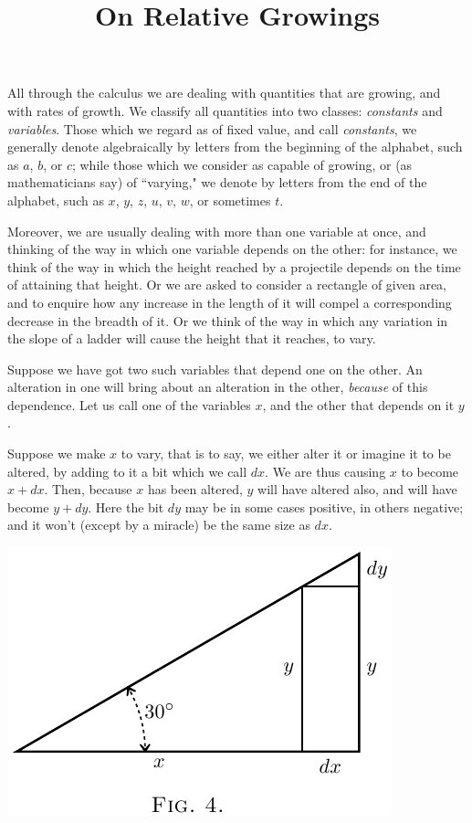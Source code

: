 \documentclass{ximera}
\title{On Relative Growings}
\begin{document}
\begin{abstract}
\end{abstract}
\maketitle

All through the calculus we are dealing with quantities
that are growing, and with rates of growth.
We classify all quantities into two classes: \textit{constants}
and \textit{variables}. Those which we regard as of fixed
value, and call \textit{constants}, we generally denote algebraically
by letters from the beginning of the
alphabet, such as $a$, $b$, or $c$; while those which we
consider as capable of growing, or (as mathematicians
say) of ``varying," we denote by letters from the end
of the alphabet, such as $x$, $y$, $z$, $u$, $v$, $w$, or sometimes $t$.

Moreover, we are usually dealing with more than
one variable at once, and thinking of the way in
which one variable depends on the other: for instance,
we think of the way in which the height reached
by a projectile depends on the time of attaining that
height. Or we are asked to consider a rectangle of
given area, and to enquire how any increase in the
length of it will compel a corresponding decrease in
the breadth of it. Or we think of the way in which
any variation in the slope of a ladder will cause the
height that it reaches, to vary.

Suppose we have got two such variables that depend one on the other. An alteration in one will bring about an alteration in the other, \textit{because} of this
dependence. Let us call one of the variables $x$, and
the other that depends on it $y$.

Suppose we make $x$ to vary, that is to say, we
either alter it or imagine it to be altered, by adding
to it a bit which we call $dx$. We are thus causing $x$
to become $x + dx$. Then, because $x$ has been altered,
$y$ will have altered also, and will have become $y + dy$.
Here the bit $dy$ may be in some cases positive, in
others negative; and it won't (except by a miracle) be
the same size as $dx$.

\begin{image}
\includegraphics{fig4.png}
\end{image}
\end{document}
